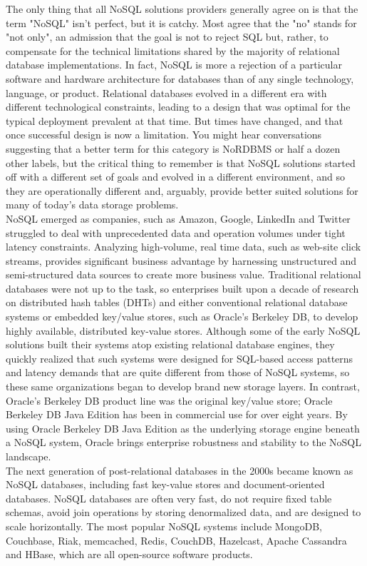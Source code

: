 \hspace*{0.7in} The only thing that all NoSQL solutions providers generally agree on is that the term "NoSQL" isn't perfect, but it is catchy. Most agree that the "no" stands for "not only", an admission that the goal is not to reject SQL but, rather, to compensate for the technical limitations shared by the majority of relational database implementations. In fact, NoSQL is more a rejection of a particular software and hardware architecture for databases than of any single technology, language, or product. Relational databases evolved in a different era with different technological constraints, leading to a design that was optimal for the typical deployment prevalent at that time. But times have changed, and that once successful design is now a limitation. You might hear conversations suggesting that a better term for this category is NoRDBMS or half a dozen other labels, but the critical thing to remember is that NoSQL solutions started off with a different set of goals and evolved in a different environment, and so they are operationally different and, arguably, provide better suited solutions for many of today's data storage problems\cite{2}.
\\
\hspace*{0.7in} NoSQL emerged as companies, such as Amazon, Google, LinkedIn and Twitter struggled to deal with unprecedented data and operation volumes under tight latency constraints. Analyzing high-volume, real time data, such as web-site click streams, provides significant business advantage by harnessing unstructured and semi-structured data sources to create more business value. Traditional relational databases were not up to the task, so enterprises built upon a decade of research on distributed hash tables (DHTs) and either conventional relational database systems or embedded key/value stores, such as Oracle's Berkeley DB, to develop highly available, distributed key-value stores. Although some of the early NoSQL solutions built their systems atop existing relational database engines, they quickly realized that such systems were designed for SQL-based access patterns and latency demands that are quite different from those of NoSQL systems, so these same organizations began to develop brand new storage layers. In contrast, Oracle's Berkeley DB product line was the original key/value store; Oracle Berkeley DB Java Edition has been in commercial use for over eight years. By using Oracle Berkeley DB Java Edition as the underlying storage engine beneath a NoSQL system, Oracle brings enterprise robustness and stability to the NoSQL landscape.\cite{3}
\\
\hspace*{0.7in} The next generation of post-relational databases in the 2000s became known as NoSQL databases, including fast key-value stores and document-oriented databases. NoSQL databases are often very fast, do not require fixed table schemas, avoid join operations by storing denormalized data, and are designed to scale horizontally. The most popular NoSQL systems include MongoDB, Couchbase, Riak, memcached, Redis, CouchDB, Hazelcast, Apache Cassandra and HBase, which are all open-source software products.

